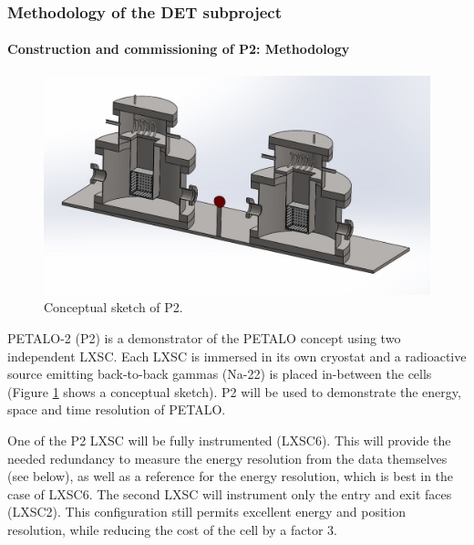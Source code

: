 \subsubsection*{Methodology of the DET subproject}

\paragraph{Construction and commissioning of P2: Methodology}

\begin{figure}[!htb]
	\centering
	\includegraphics[scale=0.5]{img/P2Open.JPG}
	\caption{\label{fig.P2} Conceptual sketch of P2.  }
\end{figure}

PETALO-2 (P2) is a demonstrator of the PETALO concept using two independent LXSC. Each LXSC is immersed in its own cryostat and a radioactive source emitting back-to-back gammas (Na-22) is placed in-between the cells (Figure \ref{fig.P2} shows a conceptual sketch). P2 will be used to demonstrate the energy, space and time resolution of PETALO.  

One of the P2 LXSC will be fully instrumented (LXSC6). This will provide the needed redundancy to measure the energy resolution from the data themselves (see below), as well as a reference for the energy resolution, which is best in the case of LXSC6. The second LXSC will  instrument only the entry and exit faces (LXSC2). This configuration still permits excellent energy and position resolution, while reducing the cost of the cell by a factor 3.

